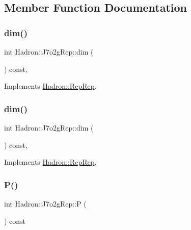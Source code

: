 \subsection{Member Function Documentation}
\mbox{\label{structHadron_1_1J7o2gRep_a97ec31b808524988adead87fa89810ef}} 
\subsubsection{\texorpdfstring{dim()}{dim()}\hspace{0.1cm}{\footnotesize\ttfamily [1/2]}}
{\footnotesize\ttfamily int Hadron\+::\+J7o2g\+Rep\+::dim (\begin{DoxyParamCaption}{ }\end{DoxyParamCaption}) const\hspace{0.3cm}{\ttfamily [inline]}, {\ttfamily [virtual]}}



Implements \mbox{\hyperlink{structHadron_1_1RepRep_a92c8802e5ed7afd7da43ccfd5b7cd92b}{Hadron\+::\+Rep\+Rep}}.

\mbox{\label{structHadron_1_1J7o2gRep_a97ec31b808524988adead87fa89810ef}} 
\subsubsection{\texorpdfstring{dim()}{dim()}\hspace{0.1cm}{\footnotesize\ttfamily [2/2]}}
{\footnotesize\ttfamily int Hadron\+::\+J7o2g\+Rep\+::dim (\begin{DoxyParamCaption}{ }\end{DoxyParamCaption}) const\hspace{0.3cm}{\ttfamily [inline]}, {\ttfamily [virtual]}}



Implements \mbox{\hyperlink{structHadron_1_1RepRep_a92c8802e5ed7afd7da43ccfd5b7cd92b}{Hadron\+::\+Rep\+Rep}}.

\mbox{\label{structHadron_1_1J7o2gRep_a62e4c7ff9d219d3d00fa5cd6ee9612d1}} 
\subsubsection{\texorpdfstring{P()}{P()}\hspace{0.1cm}{\footnotesize\ttfamily [1/2]}}
{\footnotesize\ttfamily int Hadron\+::\+J7o2g\+Rep\+::P (\begin{DoxyParamCaption}{ }\end{DoxyParamCaption}) const\hspace{0.3cm}{\ttfamily [inline]}}

